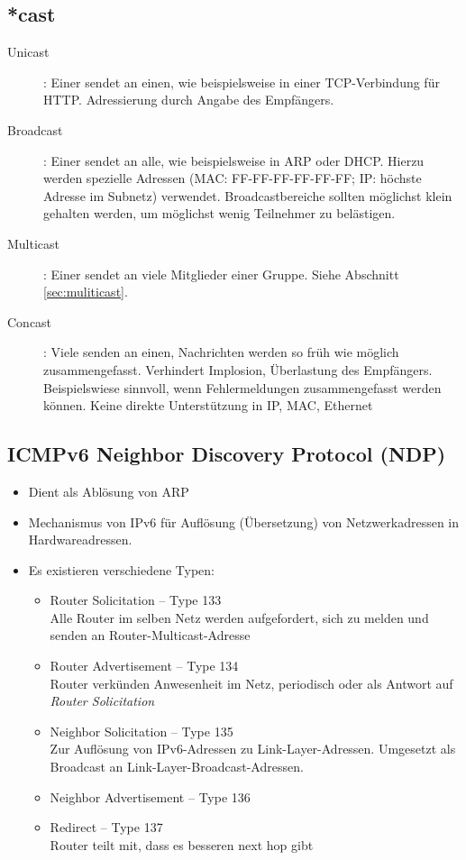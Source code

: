 \documentclass{article} %
\begin{document}
\subsection{*cast} 
\begin{description}
	\item[Unicast]: Einer sendet an einen, wie beispielsweise in einer TCP-Verbindung für HTTP. Adressierung durch Angabe des Empfängers.
	\item[Broadcast]: Einer sendet an alle, wie beispielsweise in ARP oder DHCP. Hierzu werden spezielle Adressen (MAC: FF-FF-FF-FF-FF-FF; IP: höchste Adresse im Subnetz) verwendet. Broadcastbereiche sollten möglichst klein gehalten werden, um möglichst wenig Teilnehmer zu belästigen.
	\item[Multicast]: Einer sendet an viele Mitglieder einer Gruppe. Siehe Abschnitt \ref{sec:muliticast}.
	\item[Concast]: Viele senden an einen, Nachrichten werden so früh wie möglich zusammengefasst. Verhindert Implosion, Überlastung des Empfängers. Beispielswiese sinnvoll, wenn Fehlermeldungen zusammengefasst werden können. Keine direkte Unterstützung in IP, MAC, Ethernet
\end{description}

\subsection{ICMPv6 Neighbor Discovery Protocol (NDP)} 
\begin{itemize}
	\item Dient als Ablösung von ARP
	\item Mechanismus von IPv6 für Auflösung (Übersetzung) von Netzwerkadressen in Hardwareadressen\cite{rfc4861}.
	\item Es existieren verschiedene Typen:
		\begin{itemize}
		\item Router Solicitation – Type 133 \\
		Alle Router im selben Netz werden aufgefordert, sich zu melden und senden an Router-Multicast-Adresse 
		\item Router Advertisement – Type 134 \\
		Router verkünden Anwesenheit im Netz, periodisch oder als Antwort auf \textit{Router Solicitation} 		
		\item Neighbor Solicitation – Type 135 \\
		Zur Auflösung von IPv6-Adressen zu Link-Layer-Adressen. Umgesetzt als Broadcast an Link-Layer-Broadcast-Adressen.
		\item Neighbor Advertisement – Type 136 
		\item Redirect – Type 137 \\
		Router teilt mit, dass es besseren next hop gibt 
		\end{itemize}
	
	
\end{itemize}
\end{document}
